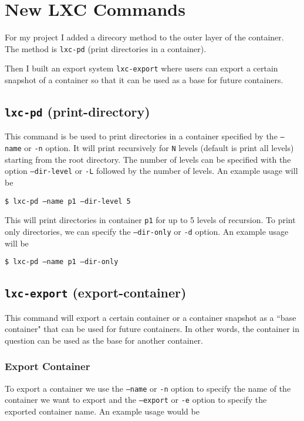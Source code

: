 \documentclass[12pt]{article}
\begin{document}
\section{New LXC Commands}

For my project I added a direcory method to the outer layer of the container. The method is \texttt{lxc-pd} (print directories in a container).

Then I built an export system \texttt{lxc-export} where users can export a certain snapshot of a container so that it can be used as a base for future containers.

\subsection{\texttt{lxc-pd} (print-directory)}

This command is be used to print directories in a container specified by the \texttt{--name} or \texttt{-n} option. It will print recursively for \texttt{N} levels (default is print all levels) starting from the root directory. The number of levels can be specified with the option \texttt{--dir-level} or \texttt{-L} followed by the number of levels. An example usage will be

\texttt{\$ lxc-pd --name p1 --dir-level 5}

\noindent This will print directories in container \texttt{p1} for up to 5 levels of recursion. To print only directories, we can specify the \texttt{--dir-only} or \texttt{-d} option. An example usage will be

\texttt{\$ lxc-pd --name p1 --dir-only}

\subsection{\texttt{lxc-export} (export-container)}

This command will export a certain container or a container snapshot as a ``base container" that can be used for future containers. In other words, the container in question can be used as the base for another container.

\subsubsection{Export Container}

To export a container we use the \texttt{--name} or \texttt{-n} option to specify the name of the container we want to export and the \texttt{--export} or \texttt{-e} option to specify the exported container name. An example usage would be
\end{document}
